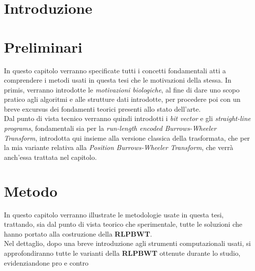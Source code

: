 \documentclass[a4paper,12pt, oneside]{book}
\begin{document}
\chapter{Introduzione}
\chapter{Preliminari}
In questo capitolo verranno specificate tutti i concetti fondamentali atti a
comprendere i metodi usati in questa tesi che le motivazioni della stessa. In
primis, verranno introdotte le \textit{motivazioni biologiche}, al fine di dare
uno scopo pratico agli algoritmi e alle strutture dati introdotte, per procedere
poi con un breve excursus dei fondamenti teorici presenti allo stato
dell'arte.\\
Dal punto di vista tecnico verranno quindi introdotti i \textit{bit vector} e
gli \textit{straight-line programs}, fondamentali sia per la \textit{run-length
  encoded Burrows-Wheeler Transform}, introdotta qui insieme alla versione
classica della trasformata, che per la mia variante relativa alla
\textit{Position Burrows-Wheeler Transform}, che verrà anch'essa trattata nel
capitolo. 














\chapter{Metodo}
In questo capitolo verranno illustrate le metodologie usate in questa tesi,
trattando, sia dal punto di vista teorico che sperimentale, tutte le soluzioni
che hanno portato alla costruzione della \textbf{RLPBWT}.\\
Nel dettaglio, dopo una breve introduzione agli strumenti computazionali usati,
si approfondiranno tutte le varianti della \textbf{RLPBWT} ottenute durante lo
studio, evidenziandone pro e contro






\end{document}
